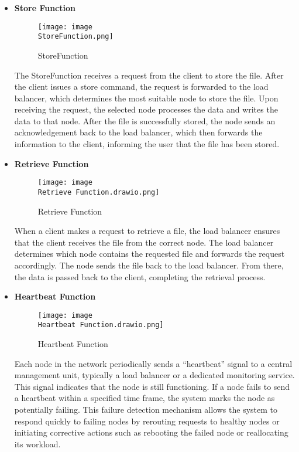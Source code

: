 \documentclass[a4paper,12pt]{article}
\begin{document}
 \begin{itemize}
     \item \textbf{Store Function}
         \begin{figure}[htbp]
         \centering
         \texttt{[image: image\\StoreFunction.png]}
         \caption{StoreFunction}
         \label{fig:enter-store}
     \end{figure}

     
     The StoreFunction receives a request from the client to store the file. After the client issues a store command, the request is forwarded to the load balancer, which determines the most suitable node to store the file.
     Upon receiving the request, the selected node processes the data and writes the data to that node. After the file is successfully stored, the node sends an acknowledgement back to the load balancer, which then forwards the information to the client, informing the user that the file has been stored.



 
     \item \textbf{Retrieve Function} 
         \begin{figure}
         \centering
         \texttt{[image: image\\Retrieve Function.drawio.png]}
         \caption{Retrieve Function}
         \label{fig:enter- retrieve}
     \end{figure}

     
     When a client makes a request to retrieve a file, the load balancer ensures that the client receives the file from the correct node. The load balancer determines which node contains the requested file and forwards the request accordingly. The node sends the file back to the load balancer. From there, the data is passed back to the client, completing the retrieval process.
     
     
     \item \textbf{Heartbeat Function}
     \begin{figure}[htbp]
         \centering
         \texttt{[image: image\\Heartbeat Function.drawio.png]}
         \caption{Heartbeat Function}
         \label{fig:enter-heartbeat}
     \end{figure}

     Each node in the network periodically sends a “heartbeat” signal to a central management unit, typically a load balancer or a dedicated monitoring service. This signal indicates that the node is still functioning. If a node fails to send a heartbeat within a specified time frame, the system marks the node as potentially failing. This failure detection mechanism allows the system to respond quickly to failing nodes by rerouting requests to healthy nodes or initiating corrective actions such as rebooting the failed node or reallocating its workload.
     
 \end{itemize}
\end{document}

